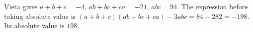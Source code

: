 Vieta gives $a+b+c=-4$, $ab+bc+ca=-21$, $abc=94$. The expression before taking absolute value is $(a+b+c)(ab+bc+ca)-3abc=84-282=-198$. Its absolute value is $\boxed{198}$.
